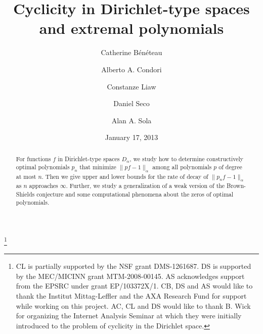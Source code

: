 \documentclass[11 pt,reqno]{amsart}
\theoremstyle{definition}
\theoremstyle{remark}
\numberwithin{equation}{section} \numberwithin{figure}{section}
\begin{document}


\title[Cyclicity and extremal polynomials]{Cyclicity in Dirichlet-type spaces and extremal polynomials}
\author[B\'en\'eteau]{Catherine B\'en\'eteau}
\address{Department of Mathematics, University of South Florida, 4202 E. Fowler Avenue, Tampa, FL 33620, USA.}
\author[Condori]{Alberto A. Condori}
\address{Department of Mathematics, Florida Gulf Coast University,
10501 FGCU Boulevard South, Fort Myers, FL 33965-6565, USA.}
\author[Liaw]{Constanze Liaw}
\address{Department of Mathematics, Baylor University, One Bear Place \#97328, Waco, TX 76798-7328, USA.}
\author[Seco]{Daniel Seco}
\address{Departament de Matem\`atiques, Universitat Aut\`onoma de Barcelona,
08193 Bellaterra, Spain.} 
\author[Sola]{Alan A. Sola}
\address{Statistical Laboratory, Centre for Mathematical Sciences,
University of Cambridge, Wilberforce Road, Cambridge CB3 0WB, UK.}
\thanks{CL is partially supported by the NSF grant DMS-1261687. DS
is supported by the MEC/MICINN grant MTM-2008-00145. AS acknowledges
support from the EPSRC under grant EP/103372X/1. CB, DS and AS would
like to thank the Institut Mittag-Leffler and the AXA Research Fund
for support while working on this project.  AC, CL and DS would like to thank B. Wick
for organizing the Internet Analysis Seminar at which they were initially introduced to the problem of cyclicity in the Dirichlet space.}
\date{January 17, 2013}



 
\begin{abstract}
For functions $f$ in Dirichlet-type spaces $D_{\alpha}$, we study how to determine
constructively optimal polynomials $p_n$ that minimize $\|p f-1\|_\alpha$
among all polynomials $p$ of degree at most $n$.  Then we give upper and lower bounds
for the rate of decay of $\|p_{n}f-1\|_{\alpha}$ as $n$ approaches $\infty$.
Further, we study a generalization of a weak version of the
Brown-Shields conjecture and some computational phenomena about the
zeros of optimal polynomials.
\end{abstract}

\maketitle
\end{document}
